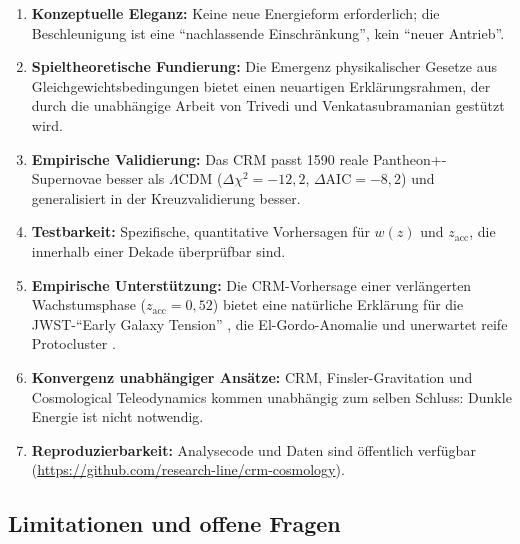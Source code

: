 \documentclass[aps,prd,twocolumn,superscriptaddress,nofootinbib]{revtex4-2}
\begin{document}
\begin{enumerate}
\item \textbf{Konzeptuelle Eleganz:} Keine neue Energieform erforderlich; die Beschleunigung ist eine ``nachlassende Einschr\"ankung'', kein ``neuer Antrieb''.
\item \textbf{Spieltheoretische Fundierung:} Die Emergenz physikalischer Gesetze aus Gleichgewichtsbedingungen bietet einen neuartigen Erkl\"arungsrahmen, der durch die unabh\"angige Arbeit von Trivedi und Venkatasubramanian \cite{Trivedi2025} gest\"utzt wird.
\item \textbf{Empirische Validierung:} Das CRM passt 1590 reale Pantheon+-Supernovae besser als $\Lambda$CDM ($\Delta\chi^2 = -12{,}2$, $\Delta\mathrm{AIC} = -8{,}2$) und generalisiert in der Kreuzvalidierung besser.
\item \textbf{Testbarkeit:} Spezifische, quantitative Vorhersagen f\"ur $w(z)$ und $z_{\mathrm{acc}}$, die innerhalb einer Dekade \"uberpr\"ufbar sind.
\item \textbf{Empirische Unterst\"utzung:} Die CRM-Vorhersage einer verl\"angerten Wachstumsphase ($z_{\mathrm{acc}} = 0{,}52$) bietet eine nat\"urliche Erkl\"arung f\"ur die JWST-``Early Galaxy Tension'' \cite{Labbe2023, BoylanKolchin2023}, die El-Gordo-Anomalie \cite{Asencio2023} und unerwartet reife Protocluster \cite{Miller2018}.
\item \textbf{Konvergenz unabh\"angiger Ans\"atze:} CRM, Finsler-Gravitation und Cosmological Teleodynamics kommen unabh\"angig zum selben Schluss: Dunkle Energie ist nicht notwendig.
\item \textbf{Reproduzierbarkeit:} Analysecode und Daten sind \"offentlich verf\"ugbar (\url{https://github.com/research-line/crm-cosmology}).
\end{enumerate}

\subsection{Limitationen und offene Fragen}
\end{document}
